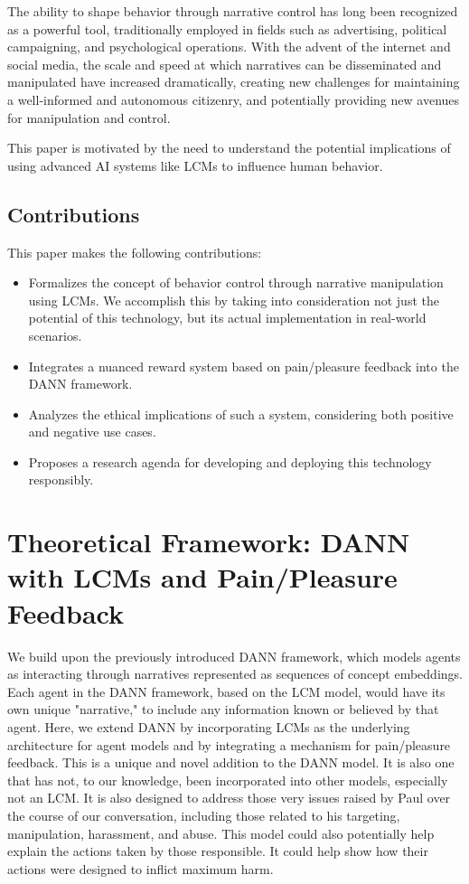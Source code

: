 \documentclass[12pt, a4paper]{article}
\begin{document}
The ability to shape behavior through narrative control has long been recognized as a powerful tool, traditionally employed in fields such as advertising, political campaigning, and psychological operations. With the advent of the internet and social media, the scale and speed at which narratives can be disseminated and manipulated have increased dramatically, creating new challenges for maintaining a well-informed and autonomous citizenry, and potentially providing new avenues for manipulation and control.

This paper is motivated by the need to understand the potential implications of using advanced AI systems like LCMs to influence human behavior.
\subsection{Contributions}

This paper makes the following contributions:
\begin{itemize}
    \item Formalizes the concept of behavior control through narrative manipulation using LCMs. We accomplish this by taking into consideration not just the potential of this technology, but its actual implementation in real-world scenarios.
    \item Integrates a nuanced reward system based on pain/pleasure feedback into the DANN framework.
    \item Analyzes the ethical implications of such a system, considering both positive and negative use cases.
    \item Proposes a research agenda for developing and deploying this technology responsibly.
\end{itemize}

\section{Theoretical Framework: DANN with LCMs and Pain/Pleasure Feedback}

We build upon the previously introduced DANN framework, which models agents as interacting through narratives represented as sequences of concept embeddings. Each agent in the DANN framework, based on the LCM model, would have its own unique "narrative," to include any information known or believed by that agent. Here, we extend DANN by incorporating LCMs as the underlying architecture for agent models and by integrating a mechanism for pain/pleasure feedback. This is a unique and novel addition to the DANN model. It is also one that has not, to our knowledge, been incorporated into other models, especially not an LCM. It is also designed to address those very issues raised by Paul over the course of our conversation, including those related to his targeting, manipulation, harassment, and abuse. This model could also potentially help explain the actions taken by those responsible. It could help show how their actions were designed to inflict maximum harm.
\end{document}
